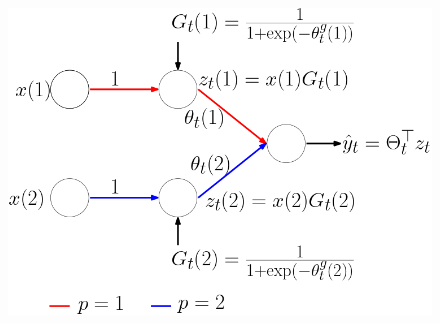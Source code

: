 \begin{figure}[h]
\begin{minipage}{0.15\columnwidth}
\includegraphics[scale=0.15]{figs/featlearn.png}
\end{minipage}
\hspace{50pt}
\begin{minipage}{0.8\columnwidth}
\end{minipage}
\end{figure}
